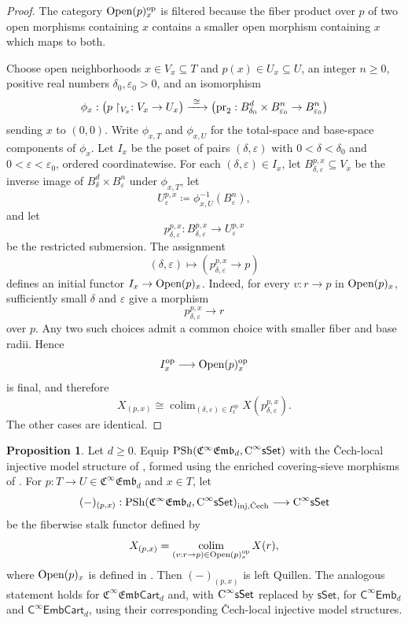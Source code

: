 \documentclass{amsart}
\newcommand{\cat}[1]{\mathsf{#1}}
\newcommand{\sset}{\cat{sSet}}
\DeclareMathOperator*{\colim}{colim}
\newcommand{\inj}{\textnormal{inj}}
\newcommand{\Cech}{\textnormal{\v{C}ech}}
\newcommand{\Open}{\textnormal{Open}}
\newcommand{\pr}{\textnormal{pr}}
\newcommand{\CsSet}{\textnormal{C}^{\infty}\sset}
\newcommand{\fembnoniso}[1]{\cat{C}^{\infty}\cat{Emb}_{#1}}
\newcommand{\fembcartnoniso}[1]{\cat{C}^{\infty}\cat{EmbCart}_{#1}}
\newcommand{\femb}[1]{\mathfrak{C}^{\infty}\mathfrak{Emb}_{#1}}
\newcommand{\fembcart}[1]{\mathfrak{C}^{\infty}\mathfrak{Emb}\cat{Cart}_{#1}}
\newcommand{\psh}{\mathrm{PSh}}
\renewcommand{\op}{\mathrm{op}}
\theoremstyle{definition}
\newtheorem{proposition}[equation]{Proposition}
\numberwithin{equation}{subsection}
\numberwithin{subsubsection}{subsection}
\begin{document}
\begin{proof}
  The category \(\Open(p)_x^{\op}\) is filtered because the fiber product
  over \(p\) of two open morphisms containing \(x\) contains a smaller open
  morphism containing \(x\) which maps to both.

  Choose open neighborhoods \(x\in V_x\subseteq T\) and
  \(p(x)\in U_x\subseteq U\), an integer \(n\geq0\), positive real numbers
  \(\delta_0,\varepsilon_0>0\), and an isomorphism
  \[
    \phi_x:
    \bigl(p\restriction_{V_x}:V_x\to U_x\bigr)
    \xrightarrow{\ \cong\ }
    \bigl(\pr_2:B^d_{\delta_0}\times B^n_{\varepsilon_0}
    \to B^n_{\varepsilon_0}\bigr)
  \]
  sending \(x\) to \((0,0)\). Write \(\phi_{x,T}\) and \(\phi_{x,U}\) for
  the total-space and base-space components of \(\phi_x\). Let \(I_x\) be
  the poset of pairs \((\delta,\varepsilon)\) with
  \(0<\delta<\delta_0\) and \(0<\varepsilon<\varepsilon_0\), ordered
  coordinatewise. For each \((\delta,\varepsilon)\in I_x\), let
  \(B^{p,x}_{\delta,\varepsilon}\subseteq V_x\) be the inverse image of
  \(B^d_\delta\times B^n_\varepsilon\) under \(\phi_{x,T}\), let
  \[
    U^{p,x}_\varepsilon\coloneqq\phi_{x,U}^{-1}(B^n_\varepsilon),
  \]
  and let
  \[
    p^{p,x}_{\delta,\varepsilon}:
    B^{p,x}_{\delta,\varepsilon}\longrightarrow U^{p,x}_\varepsilon
  \]
  be the restricted submersion. The assignment
  \[
    (\delta,\varepsilon)\longmapsto
    (p^{p,x}_{\delta,\varepsilon}\to p)
  \]
  defines an initial functor \(I_x\to\Open(p)_x\). Indeed, for every
  \(v:r\to p\) in \(\Open(p)_x\), sufficiently small \(\delta\) and
  \(\varepsilon\) give a morphism
  \[
    p^{p,x}_{\delta,\varepsilon}\longrightarrow r
  \]
  over \(p\). Any two such choices admit a common choice with smaller fiber
  and base radii. Hence
  \[
    I_x^{\op}\longrightarrow\Open(p)_x^{\op}
  \]
  is final, and therefore
  \begin{equation}\label{eq:femb.fiberwise.stalk.local.trivialization}
    X_{(p,x)}
    \cong
    \colim_{(\delta,\varepsilon)\in I_x^{\op}}
    X(p^{p,x}_{\delta,\varepsilon}).
  \end{equation}
  The other cases are identical.
\end{proof}

\begin{proposition}\label{prop:femb.stalk.left.quillen}
  Let \(d\geq0\). Equip \(\psh(\femb{d},\CsSet)\) with the
  \v{C}ech-local injective model structure of
  , formed using the enriched
  covering-sieve morphisms of . For
  \(p:T\to U\in\femb{d}\) and \(x\in T\), let
  \[
    (-)_{(p,x)}:
    \psh(\femb{d},\CsSet)_{\inj,\Cech}\longrightarrow\CsSet
  \]
  be the fiberwise stalk functor defined by
  \[
    X_{(p,x)}
    =
    \colim_{(v:r\to p)\in\Open(p)_x^{\op}}X(r),
  \]
  where \(\Open(p)_x\) is defined in
  . Then \((- )_{(p,x)}\) is left
  Quillen. The analogous statement holds for \(\fembcart{d}\) and, with
  \(\CsSet\) replaced by \(\sset\), for \(\fembnoniso{d}\) and
  \(\fembcartnoniso{d}\), using their corresponding \v{C}ech-local injective
  model structures.
\end{proposition}
\end{document}
